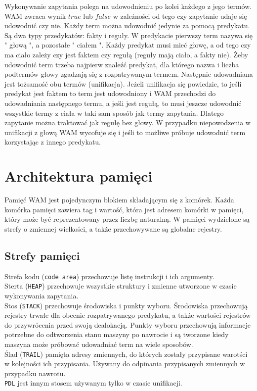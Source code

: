 Wykonywanie zapytania polega na udowodnieniu po kolei każdego z jego termów. WAM zwraca wynik $true$ lub $false$ w zależności od tego czy zapytanie udaje się udowodnić czy nie. Każdy term można udowodnić jedynie za pomocą predykatu. Są dwa typy przedykatów: fakty i reguły. W predykacie pierwszy term nazywa się " głową ", a pozostałe " ciałem ". Każdy predykat musi mieć głowę, a od tego czy ma ciało zależy czy jest faktem czy regułą (reguły mają ciało, a fakty nie). Żeby udowodnić term trzeba najpierw znaleźć predykat, dla którego nazwa i liczba podtermów głowy zgadzają się z rozpatrywanym termem. Następnie udowadniana jest tożsamość obu termów (unifikacja). Jeżeli unifikacja się powiedzie, to jeśli predykat jest faktem to term jest udowodniony i WAM przechodzi do udowadniania następnego termu, a jeśli jest regułą, to musi jeszcze udowodnić wszystkie termy z ciała w taki sam sposób jak termy zapytania. Dlatego zapytanie można traktować jak regułę bez głowy. W przypadku niepowodzenia w unifikacji z głową WAM wycofuje się i jeśli to możliwe próbuje udowodnić term korzystając z innego predykatu.

\section{Architektura pamięci}

Pamięć WAM jest pojedynczym blokiem składającym się z komórek. Każda komórka pamięci zawiera tag i wartość, która jest adresem komórki w pamięci, który może być reprezentowany przez liczbę naturalną. W pamięci wydzielone są strefy o zmiennej wielkości, a także przechowywane są globalne rejestry.

\subsection{Strefy pamięci}

Strefa kodu (\texttt{code area}) przechowuje listę instrukcji i ich argumenty.\\
Sterta (\texttt{HEAP}) przechowuje wszystkie struktury i zmienne utworzone w czasie wykonywania zapytania.\\
Stos (\texttt{STACK}) przechowuje środowiska i punkty wyboru. Środowiska przechowują rejestry trwałe dla obecnie rozpatrywanego predykatu, a także wartości rejestrów do przywrócenia przed swoją dealokacją. Punkty wyboru przechowują informacje potrzebne do odtworzenia stanu maszyny po nawrocie i są tworzone kiedy maszyna może próbować udowadniać term na wiele sposobów.\\
Ślad (\texttt{TRAIL}) pamięta adresy zmiennych, do których zostały przypisane warotści w kolejności ich przypisania. Używany do odpinania przypisanych zmiennych w przypadku nawrotu.\\
\texttt{PDL} jest innym stosem używanym tylko w czasie unifikacji.

